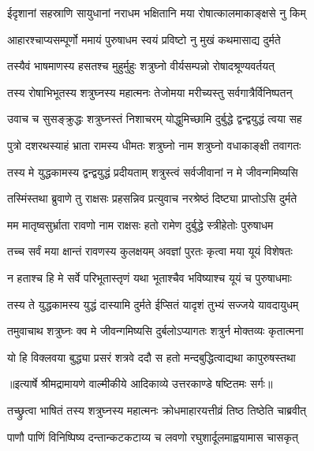 \twolineshloka
{ईदृशानां सहस्राणि सायुधानां नराधम}
{भक्षितानि मया रोषात्कालमाकाङ्क्षसे नु किम्} %

\twolineshloka
{आहारश्चाप्यसम्पूर्णो ममायं पुरुषाधम}
{स्वयं प्रविष्टो नु मुखं कथमासाद्य दुर्मते} %

\twolineshloka
{तस्यैवं भाषमाणस्य हसतश्च मुहुर्मुहुः}
{शत्रुघ्नो वीर्यसम्पन्नो रोषादश्रूण्यवर्तयत्} %

\twolineshloka
{तस्य रोषाभिभूतस्य शत्रुघ्नस्य महात्मनः}
{तेजोमया मरीच्यस्तु सर्वगात्रैर्विनिष्पतन्} %

\twolineshloka
{उवाच च सुसङ्क्रुद्धः शत्रुघ्नस्तं निशाचरम्}
{योद्धुमिच्छामि दुर्बुद्धे द्वन्द्वयुद्धं त्वया सह} %

\twolineshloka
{पुत्रो दशरथस्याहं भ्राता रामस्य धीमतः}
{शत्रुघ्नो नाम शत्रुघ्नो वधाकाङ्क्षी तवागतः} %

\twolineshloka
{तस्य मे युद्धकामस्य द्वन्द्वयुद्धं प्रदीयताम्}
{शत्रुस्त्वं सर्वजीवानां न मे जीवन्गमिष्यसि} %

\twolineshloka
{तस्मिंस्तथा ब्रुवाणे तु राक्षसः प्रहसन्निव}
{प्रत्युवाच नरश्रेष्ठं दिष्ट्या प्राप्तोऽसि दुर्मते} %

\twolineshloka
{मम मातृष्वसुर्भ्राता रावणो नाम राक्षसः}
{हतो रामेण दुर्बुद्धे स्त्रीहेतोः पुरुषाधम} %

\twolineshloka
{तच्च सर्वं मया क्षान्तं रावणस्य कुलक्षयम्}
{अवज्ञां पुरतः कृत्वा मया यूयं विशेषतः} %

\twolineshloka
{न हताश्च हि मे सर्वे परिभूतास्तृणं यथा}
{भूताश्चैव भविष्याश्च यूयं च पुरुषाधमाः} %

\twolineshloka
{तस्य ते युद्धकामस्य युद्धं दास्यामि दुर्मते}
{ईप्सितं यादृशं तुभ्यं सज्जये यावदायुधम्} %

\twolineshloka
{तमुवाचाथ शत्रुघ्नः क्व मे जीवन्गमिष्यसि}
{दुर्बलोऽप्यागतः शत्रुर्न मोक्तव्यः कृतात्मना} %

\twolineshloka
{यो हि विक्लवया बुद्ध्या प्रसरं शत्रवे ददौ}
{स हतो मन्दबुद्धित्वाद्यथा कापुरुषस्तथा} %


{॥इत्यार्षे श्रीमद्रामायणे वाल्मीकीये आदिकाव्ये उत्तरकाण्डे षष्टितमः सर्गः॥}


\twolineshloka
{तच्छ्रुत्वा भाषितं तस्य शत्रुघ्नस्य महात्मनः}
{क्रोधमाहारयत्तीव्रं तिष्ठ तिष्ठेति चाब्रवीत्} %

\twolineshloka
{पाणौ पाणिं विनिष्पिष्य दन्तान्कटकटाय्य च}
{लवणो रघुशार्दूलमाह्वयामास चासकृत्} %

